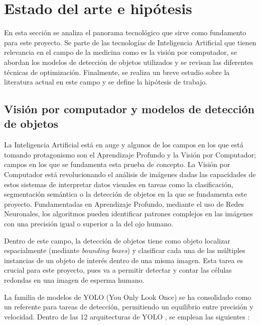 \documentclass[12pt,a4paper,onecolumn,oneside]{report}
\begin{document}
\section{Estado del arte e hipótesis}
\label{sec:Estado del arte e hipótesis}

En esta sección se analiza el panorama tecnológico que sirve como fundamento para este proyecto. Se parte de las tecnologías de Inteligencia Artificial que tienen relevancia en el campo de la medicina como es la 
visión por computador, se abordan los modelos de detección de objetos utilizados y se revisan las diferentes técnicas de optimización. Finalmente, se realiza un breve estudio sobre la literatura actual 
en este campo y se define la hipótesis de trabajo.

\subsection{Visión por computador y modelos de detección de objetos}

La Inteligencia Artificial está en auge y algunos de los campos en los que está tomando protagonismo son el Aprendizaje Profundo y la Visión por Computador; campos en los que se fundamenta esta prueba de concepto.
La Visión por Computador está revolucionando el análisis de imágenes dadas las capacidades de estos sistemas de interpretar datos visuales en tareas como la clasificación, segmentación semántica o la detección de objetos en la que se fundamenta este proyecto.
Fundamentadas en Aprendizaje Profundo, mediante el uso de Redes Neuronales, los algoritmos pueden identificar patrones complejos en las imágenes con una precisión igual o superior a la del ojo humano. 

Dentro de este campo, la detección de objetos tiene como objeto localizar espacialmente (mediante \textit{bounding boxes}) y clasificar cada una de las múltiples instancias de un objeto de interés dentro de una misma imagen.
Esta tarea es crucial para este proyecto, pues va a permitir detectar y contar las células redondas en una imagen de esperma humano.

La familia de modelos de YOLO (You Only Look Once) \cite{ultralytics_models} se ha consolidado como un referente para tareas de detección, permitiendo un equilibrio entre precisión y velocidad.
Dentro de las 12 arquitecturas de YOLO \cite{ultralytics_models}, se emplean las siguientes \cite{defyolos}:
\end{document}
